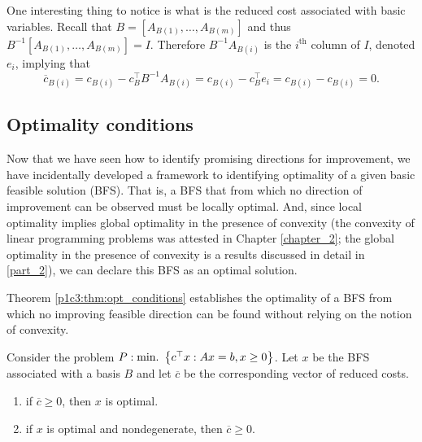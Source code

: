 One interesting thing to notice is what is the reduced cost associated with basic variables. Recall that $B = [A_{B(1)}, \dots, A_{B(m)}]$ and thus $B^{-1}[A_{B(1)}, \dots, A_{B(m)}] = I$. Therefore $B^{-1}A_{B(i)}$ is the $i^\text{th}$ column of $I$, denoted $e_i$, implying that
%
\begin{equation*}
	\overline{c}_{B(i)} = c_{B(i)} - c^\top_B B^{-1} A_{B(i)} = c_{B(i)} - c_B^\top e_i = c_{B(i)} - c_{B(i)} = 0.	
\end{equation*}


\subsection{Optimality conditions}

Now that we have seen how to identify promising directions for improvement, we have incidentally developed a framework to identifying optimality of a given basic feasible solution (BFS). That is, a BFS that from which no direction of improvement can be observed must be locally optimal. And, since local optimality implies global optimality in the presence of convexity (the convexity of linear programming problems was attested in Chapter \ref{chapter_2}; the global optimality in the presence of convexity is a results discussed in detail in \ref{part_2}), we can declare this BFS as an optimal solution. 

Theorem \ref{p1c3:thm:opt_conditions} establishes the optimality of a BFS from which no improving feasible direction can be found without relying on the notion of convexity.

\begin{theorem}\label{p1c3:thm:opt_conditions}
	Consider the problem $P : \mathop{\text{min.~}}\left\{ c^\top x : Ax = b, x \geq 0 \right \}$. Let $x$ be the BFS associated with a basis $B$ and let $\overline{c}$ be the corresponding vector of reduced costs.
	\begin{enumerate}
		\item if $\overline{c} \geq 0$, then $x$ is optimal.
		\item if $x$ is optimal and nondegenerate, then $\overline{c} \geq 0$.	
	\end{enumerate}
\end{theorem}

